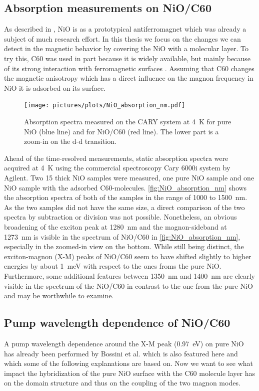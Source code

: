 \subsection{Absorption measurements on NiO/C60}
As described in \cite{rezende_introduction_2019}, NiO is as a prototypical antiferromagnet which was already a subject of much research effort.
In this thesis we focus on the changes we can detect in the magnetic behavior by covering the NiO with a molecular layer.
To try this, C60 was used in part because it is widely available, but mainly because of its strong interaction with ferromagnetic surfaces \cite{veenstra_interface_2002}.
Assuming that C60 changes the magnetic anisotropy which has a direct influence on the magnon frequency in NiO it is adsorbed on its surface.
\begin{figure}[ht]
    \centering
    \texttt{[image: pictures/plots/NiO\_absorption\_nm.pdf]}
    \caption{Absorption spectra measured on the CARY system at \qty{4}{K} for pure NiO (blue line) and for NiO/C60 (red line). The lower part is a zoom-in on the d-d transition.}
    \label{fig:NiO_absorption_nm}
\end{figure}
\FloatBarrier
Ahead of the time-resolved measurements, static absorption spectra were acquired at \qty{4}{K} using the commercial spectroscopy Cary 6000i system by Agilent.
Two \qty{15}{\mu} thick NiO samples were measured, one pure NiO sample and one NiO sample with the adsorbed C60-molecules.
\autoref{fig:NiO_absorption_nm} shows the absorption spectra of both of the samples in the range of 1000 to \qty{1500}{nm}.
As the two samples did not have the same size, a direct comparison of the two spectra by subtraction or division was not possible.
Nonetheless, an obvious broadening of the exciton peak at \qty{1280}{nm} and the magnon-sideband at \qty{1273}{nm} is visible in the spectrum of NiO/C60 in \autoref{fig:NiO_absorption_nm}, especially in the zoomed-in view on the bottom.
While still being distinct, the exciton-magnon (X-M) peaks of NiO/C60 seem to have shifted slightly to higher energies by about \qty{1}{meV} with respect to the ones froms the pure NiO.
Furthermore, some additional features between \qty{1350}{nm} and \qty{1400}{nm} are clearly visible in the spectrum of the NiO/C60 in contrast to the one from the pure NiO and may be worthwhile to examine.

\subsection{Pump wavelength dependence of NiO/C60}
A pump wavelength dependence around the X-M peak (\qty{0.97}{eV}) on pure NiO has already been performed by Bossini et al. \cite{bossini_ultrafast_2021} which is also featured here and which some of the following explanations are based on.
Now we want to see what impact the hybridization of the pure NiO surface with the C60 molecule layer has on the domain structure and thus on the coupling of the two magnon modes.

